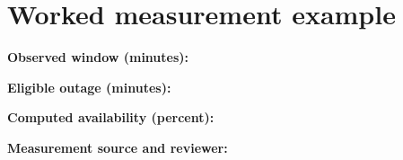 \documentclass[10pt,letterpaper]{article}
\begin{document}
\section{Worked measurement example}
\noindent\textbf{Observed window (minutes):}\quad\underline{\hspace{1.6in}}\par
\noindent\textbf{Eligible outage (minutes):}\quad\underline{\hspace{1.6in}}\par
\noindent\textbf{Computed availability (percent):}\quad\underline{\hspace{1.6in}}\par
\noindent\textbf{Measurement source and reviewer:}\quad\underline{\hspace{1.6in}}\par


\end{document}
